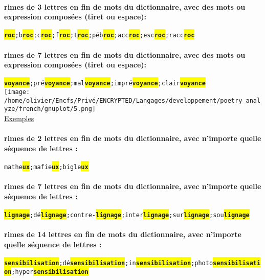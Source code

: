 \documentclass[french]{article}
\begin{document}
\paragraph{rimes de 3 lettres en fin de mots du dictionnaire, avec des mots ou expression composées (tiret ou espace):\\}
\texttt{\colorbox{yellow}{\textbf{roc}};b\colorbox{yellow}{\textbf{roc}};c\colorbox{yellow}{\textbf{roc}};f\colorbox{yellow}{\textbf{roc}};t\colorbox{yellow}{\textbf{roc}};péb\colorbox{yellow}{\textbf{roc}};acc\colorbox{yellow}{\textbf{roc}};esc\colorbox{yellow}{\textbf{roc}};racc\colorbox{yellow}{\textbf{roc}}}\\
\paragraph{rimes de 7 lettres en fin de mots du dictionnaire, avec des mots ou expression composées (tiret ou espace):\\}
\texttt{\colorbox{yellow}{\textbf{voyance}};pré\colorbox{yellow}{\textbf{voyance}};mal\colorbox{yellow}{\textbf{voyance}};impré\colorbox{yellow}{\textbf{voyance}};clair\colorbox{yellow}{\textbf{voyance}}}\\
\newpage
\texttt{[image: /home/olivier/Encfs/Privé/ENCRYPTED/Langages/developpement/poetry\_analyze/french/gnuplot/5.png]}\\
\underline{Exemples}\\
\paragraph{rimes de 2 lettres en fin de mots du dictionnaire, avec n'importe quelle séquence de lettres :\\}
\texttt{mathe\colorbox{yellow}{\textbf{ux}};mafie\colorbox{yellow}{\textbf{ux}};bigle\colorbox{yellow}{\textbf{ux}}}\\
\paragraph{rimes de 7 lettres en fin de mots du dictionnaire, avec n'importe quelle séquence de lettres :\\}
\texttt{\colorbox{yellow}{\textbf{lignage}};dé\colorbox{yellow}{\textbf{lignage}};contre-\colorbox{yellow}{\textbf{lignage}};inter\colorbox{yellow}{\textbf{lignage}};sur\colorbox{yellow}{\textbf{lignage}};sou\colorbox{yellow}{\textbf{lignage}}}\\
\paragraph{rimes de 14 lettres en fin de mots du dictionnaire, avec n'importe quelle séquence de lettres :\\}
\texttt{\colorbox{yellow}{\textbf{sensibilisation}};dé\colorbox{yellow}{\textbf{sensibilisation}};in\colorbox{yellow}{\textbf{sensibilisation}};photo\colorbox{yellow}{\textbf{sensibilisation}};hyper\colorbox{yellow}{\textbf{sensibilisation}}}\\
\newpage
\end{document}

